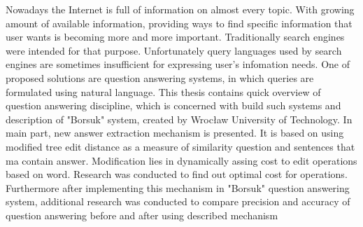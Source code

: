 \documentclass[a4paper, twoside, openright, 12pt]{report}
\newenvironment{abstractpage}
  {\vspace*{\fill}\thispagestyle{empty}}
    {\vfill}
\renewenvironment{abstract}[1]
      {\bigskip\selectlanguage{#1}%
             \begin{center}\bfseries\abstractname\end{center}}
           {\par\bigskip}
\begin{document}
\begin{abstractpage}
\begin{abstract}{english}
    Nowadays the Internet is full of information on almost every topic. With growing amount of available information,
    providing ways to find specific information that user wants is becoming more and more important. Traditionally
    search engines were intended for that purpose. Unfortunately query languages used by search engines are sometimes
    insufficient for expressing user's infomation needs. One of proposed solutions are question answering systems, in which
    queries are formulated using natural language. This thesis contains quick overview of question answering discipline,
    which is concerned with build such systems and description of "Borsuk" system, created by Wrocław University of Technology.
    In main part, new answer extraction mechanism is presented. It is based on using modified tree edit distance as a measure of
    similarity question and sentences that ma contain answer. Modification lies in dynamically assing cost to edit operations
    based on word. Research was conducted to find out optimal cost for operations. Furthermore after implementing this
    mechanism in "Borsuk" question answering system, additional research was conducted to compare precision and accuracy
    of question answering before and after using described mechanism
\end{abstract}
\end{abstractpage}

\tableofcontents

\listoffigures
\end{document}
